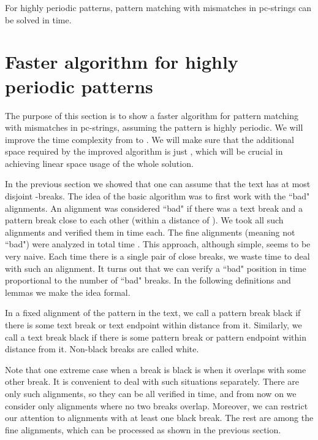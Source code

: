 \documentclass[runningheads]{llncs}
\begin{document}
\begin{theorem}\label{theorem:algorithm_highlyperiodic}
For highly periodic patterns, pattern matching with  mismatches in pc-strings can be solved in  time.
\end{theorem}


\section{Faster algorithm for highly periodic patterns}
\label{section:faster}


The purpose of this section is to show a faster algorithm for pattern matching with  mismatches in pc-strings, assuming the pattern is highly periodic. We will improve the time complexity from  to . We will make sure that the additional space required by the improved algorithm is just , which will
be crucial in achieving linear space usage of the whole solution.


In the previous section we showed that one can assume that the text has at most  disjoint -breaks. The idea of the basic algorithm was to first work with the ``bad" alignments. An alignment was considered ``bad" if there was a text break and a pattern break close to each other (within a distance of ). We took all such alignments and verified them in  time each. The fine alignments (meaning not ``bad") were analyzed in total time . This approach, although simple, seems to be very naive. Each time there is a single pair of close breaks, we waste  time to deal with such an alignment. It turns out that we can verify a ``bad" position in time proportional to the number of ``bad" breaks. In the following definitions and lemmas we make the idea formal.


\begin{definition}
In a fixed alignment of the pattern in the text, we call a pattern break black if there is some text break or text endpoint within distance  from it. Similarly, we call a text break black if there is some pattern break or pattern endpoint within distance  from it. Non-black breaks are called white.
\end{definition}

Note that one extreme case when a break is black is when it overlaps with some other break. It is convenient to deal with such situations separately. There are only  such alignments, so they can be all verified in  time, and from now on we consider only alignments where no two breaks overlap. Moreover, we can restrict our attention to alignments with at least one black break. The rest are among the fine alignments, which can be processed as shown in the previous section.
\end{document}
